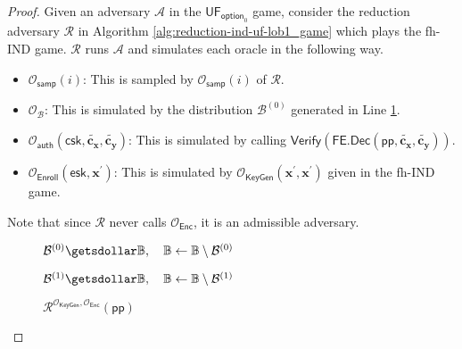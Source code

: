 \begin{proof}
\label{proof:ind-uf-lob1}
	Given an adversary $\mathcal{A}$ in the $\textsf{UF}_{\textsf{option}_0}$ game, consider the reduction adversary $\mathcal{R}$ in Algorithm \ref{alg:reduction-ind-uf-lob1_game} which plays the \textsf{fh-IND} game. $\mathcal{R}$ runs $\mathcal{A}$ and simulates each oracle in the following way.

\begin{itemize}
	\item $\mathcal{O}_{\textsf{samp}}(i)$: This is sampled by $\mathcal{O}_{\textsf{samp}}(i)$ of $\mathcal{R}$.
	
	\item $\mathcal{O}_{\mathcal{B}}$: This is simulated by the distribution $\mathcal{B}^{(0)}$ generated in Line \ref{alg:reduction-ind-uf-lob1_game:B}.

	\item $\mathcal{O}_{\textsf{auth}} (\textsf{csk}, \mathbf{\tilde{c_x}}, \mathbf{\tilde{c_y}})$: This is simulated by calling $\textsf{Verify}( \textsf{FE.Dec}(\textsf{pp}, \mathbf{\tilde{c_x}}, \mathbf{\tilde{c_y}}) )$.

	\item $\mathcal{O}_{\textsf{Enroll}}( \textsf{esk}, \mathbf{x}^\prime )$: This is simulated by $\mathcal{O}_{\textsf{KeyGen}}(\mathbf{x}^\prime, \mathbf{x}^\prime)$ given in the \textsf{fh-IND} game.

\end{itemize}
	
\noindent Note that since $\mathcal{R}$ never calls $\mathcal{O}_{\textsf{Enc}}$, it is an admissible adversary.

\begin{figure}[h]
\centering
	
	\begin{minipage}[t]{0.5\linewidth}
	\centering
	\begin{algorithm}[H]
		\caption{$\mathcal{R}^{\mathcal{O}_{\textsf{KeyGen}}, \mathcal{O}_{\textsf{Enc}}}(\textsf{pp})$}
	\label{alg:reduction-ind-uf-lob1_game}
	\begin{algorithmic}[1]
		\State $\mathcal{B}^{(0)} \getsdollar \mathbb{B}, \quad \mathbb{B} \gets \mathbb{B} \setminus \mathcal{B}^{(0)}$ \label{alg:reduction-ind-uf-lob1_game:B}

		\State $\mathcal{B}^{(1)} \getsdollar \mathbb{B}, \quad \mathbb{B} \gets \mathbb{B} \setminus \mathcal{B}^{(1)}$


\end{algorithmic}
\end{algorithm}
\end{minipage}
\end{figure}
\end{proof}
